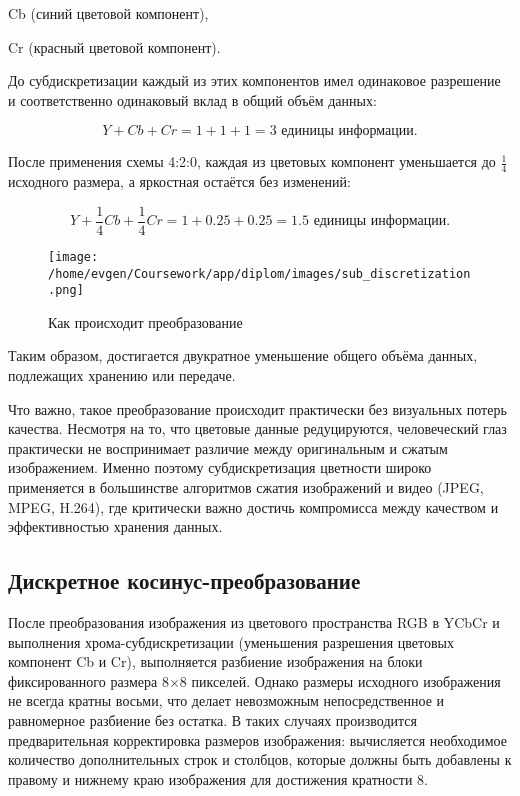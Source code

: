 Cb (синий цветовой компонент),

Cr (красный цветовой компонент).

До субдискретизации каждый из этих компонентов имел одинаковое разрешение и соответственно одинаковый вклад в общий объём данных:


\begin{equation}
    Y + Cb + Cr = 1+1+1=3 \text{ единицы информации}.
\end{equation}

После применения схемы 4:2:0, каждая из цветовых компонент уменьшается до $\frac{1}{4}$ исходного размера, а яркостная остаётся без изменений:

\begin{equation}
    Y + \frac{1}{4}Cb + \frac{1}{4}Cr = 1 + 0.25 + 0.25 = 1.5 \text{ единицы информации}.
\end{equation}

\begin{figure}[H]
    \centering
    \texttt{[image: /home/evgen/Coursework/app/diplom/images/sub\_discretization.png]}
    \caption{Как происходит преобразование}
    \label{fig:sub_dis}
\end{figure}

Таким образом, достигается двукратное уменьшение общего объёма данных, подлежащих хранению или передаче.

Что важно, такое преобразование происходит практически без визуальных потерь качества. 
Несмотря на то, что цветовые данные редуцируются, человеческий глаз практически не воспринимает различие между оригинальным и сжатым изображением. 
Именно поэтому субдискретизация цветности широко применяется в большинстве алгоритмов сжатия изображений и видео (JPEG, MPEG, H.264),
где критически важно достичь компромисса между качеством и эффективностью хранения данных.

\subsection{Дискретное косинус-преобразование}

После преобразования изображения из цветового пространства RGB в YCbCr и выполнения хрома-субдискретизации (уменьшения разрешения цветовых компонент Cb и Cr), 
выполняется разбиение изображения на блоки фиксированного размера 8×8 пикселей. 
Однако размеры исходного изображения не всегда кратны восьми, что делает невозможным непосредственное и равномерное разбиение без остатка. 
В таких случаях производится предварительная корректировка размеров изображения: вычисляется необходимое количество дополнительных строк и столбцов, 
которые должны быть добавлены к правому и нижнему краю изображения для достижения кратности 8.

